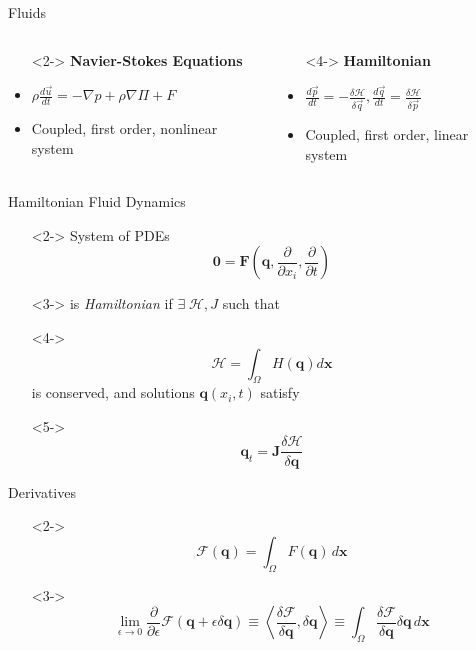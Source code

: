 \documentclass{beamer}
\begin{document}
			\begin{frame}[t]{Fluids}
				\begin{columns}
					\begin{column}{0.5\textwidth}
						\begin{itemize}
							\item[]<2-> \textbf{Navier-Stokes Equations}
							\item<3-> $\rho\frac{d \vec u}{dt} = -\nabla p + \rho \nabla \Pi + F$
							\item<3-> Coupled, first order, nonlinear system
						\end{itemize}
					\end{column}
					\begin{column}{0.5\textwidth}
						\begin{itemize}
							\item[]<4-> \textbf{Hamiltonian}
							\item<5-> $\frac{d \vec p}{dt} = -\frac{\delta \mathcal{H}}{\delta \vec q}, \frac{d \vec q}{dt} = \frac{\delta \mathcal{H}}{\delta \vec p}$
							\item<5-> Coupled, first order, linear system
						\end{itemize}
					\end{column}
				\end{columns}
			\end{frame}
			\begin{frame}[t]{Hamiltonian Fluid Dynamics}
				\begin{itemize}
					\item[]<2-> System of PDEs $$\mathbf{0} = \textbf{F}\left(\mathbf{q}, \frac{\partial}{\partial x_i}, \frac{\partial}{\partial t} \right)$$
					\item[]<3-> is \emph{Hamiltonian} if $\exists \; \mathcal{H}, J$ such that
					\item[]<4->$$\mathcal{H} = \int_\Omega H(\mathbf{q}) d\mathbf{x}$$ is conserved, and solutions $\mathbf{q}(x_i, t)$ satisfy
					\item[]<5-> $$\mathbf{q}_t = \mathbf{J}\frac{\delta \mathcal{H}}{\delta \mathbf{q}}$$
				\end{itemize}
			\end{frame}
			\begin{frame}[t]{Derivatives}
				\begin{itemize}
					\item[]<2->$$ \mathcal{F}(\mathbf{q}) = \int_\Omega F(\mathbf{q}) \, d\mathbf{x} $$
					\item[]<3->$$ \lim_{\epsilon \rightarrow 0} \frac{\partial}{\partial \epsilon}\mathcal{F}(\mathbf{q} + \epsilon\delta\mathbf{q}) \equiv \left< \frac{\delta \mathcal{F}}{\delta \mathbf{q}}, \delta\mathbf{q} \right> \equiv \int_\Omega \frac{\delta \mathcal{F}}{\delta \mathbf{q}} \delta\mathbf{q} \, d\mathbf{x} $$
				\end{itemize}
			\end{frame}
\end{document}
